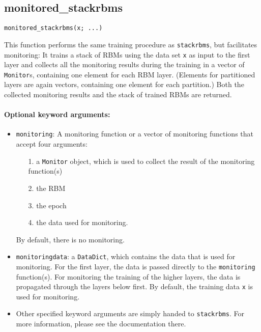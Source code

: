 \subsection*{monitored\_stackrbms}  \label{bms_monitored_stackrbms}
\begin{verbatim}
monitored_stackrbms(x; ...)
\end{verbatim}
This function performs the same training procedure as \texttt{stackrbms}, but facilitates monitoring: It trains a stack of RBMs using the data set \texttt{x} as input to the first layer and collects all the monitoring results during the training in a vector of \texttt{Monitor}s, containing one element for each RBM layer. (Elements for partitioned layers are again vectors, containing one element for each partition.) Both the collected monitoring results and the stack of trained RBMs are returned.

\paragraph*{Optional keyword arguments:}
\begin{itemize}
\item \texttt{monitoring}: A monitoring function or a vector of monitoring functions that accept four arguments:

\begin{itemize}
\item[1. ] a \texttt{Monitor} object, which is used to collect the result of the monitoring function(s)


\item[2. ] the RBM


\item[3. ] the epoch


\item[4. ] the data used for monitoring.

\end{itemize}
By default, there is no monitoring.


\item \texttt{monitoringdata}: a \texttt{DataDict}, which contains the data that is used for  monitoring. For the first layer, the data is passed directly to the \texttt{monitoring}  function(s). For monitoring the training of the higher layers,  the data is propagated through the layers below first.  By default, the training data \texttt{x} is used for monitoring.


\item Other specified keyword arguments are simply handed to \texttt{stackrbms}. For more information, please see the documentation there.

\end{itemize}
